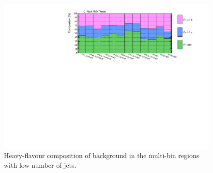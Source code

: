 \begin{figure}[htbp]
\includegraphics[width=\textwidth]{figures/strong_prod/comp_plots/Lnj_HF.pdf}
\caption{Heavy-flavour composition of \ttbar background in the multi-bin regions with low number of jets.}
	\label{fig:HFcomp_Lnj}
\end{figure}

\FloatBarrier

\FloatBarrier


